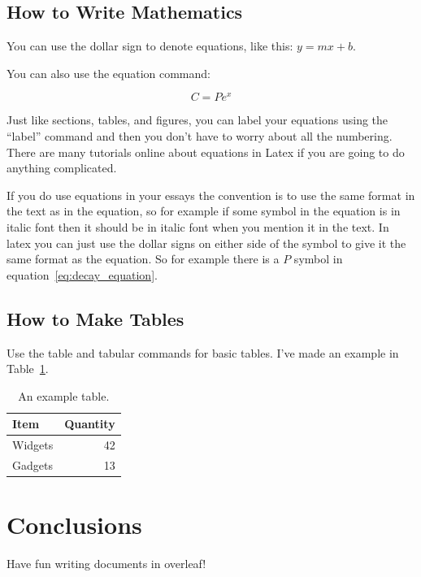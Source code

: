 \documentclass[a4paper]{article}
\begin{document}
\subsection{How to Write Mathematics}

You can use the dollar sign to denote equations, like this: $y = mx+b$. 

You can also use the equation command:

\begin{equation}
\label{eq:decay_equation}
C = P e^x
\end{equation}

Just like sections, tables, and figures, you can label your equations using the ``label'' command and then you don't have to worry about all the numbering. There are many tutorials online about equations in Latex if you are going to do anything complicated. 

If you do use equations in your essays the convention is to use the same format in the text as in the equation, so for example if some symbol in the equation is in italic font then it should be in italic font when you mention it in the text. In latex you can just use the dollar signs on either side of the symbol to give it the same format as the equation. So for example there is a $P$ symbol in equation~\ref{eq:decay_equation}.

\subsection{How to Make Tables}

Use the table and tabular commands for basic tables. I've made an example in Table~\ref{tab:widgets}.

\begin{table}[H]
\centering
\begin{tabular}{l|r}
Item & Quantity \\\hline
Widgets & 42 \\
Gadgets & 13
\end{tabular}
\caption{An example table.}
\label{tab:widgets}
\end{table}

\section{Conclusions}
\label{sec:conclusions}
Have fun writing documents in overleaf!



\end{document}
